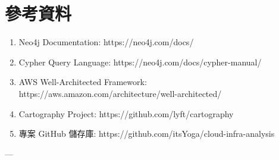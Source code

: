 \documentclass[11pt,a4paper]{ctexart}
\begin{document}
\section{參考資料}

\begin{enumerate}[leftmargin=1.5em]
\item Neo4j Documentation: https://neo4j.com/docs/
\item Cypher Query Language: https://neo4j.com/docs/cypher-manual/
\item AWS Well-Architected Framework: https://aws.amazon.com/architecture/well-architected/
\item Cartography Project: https://github.com/lyft/cartography
\item 專案 GitHub 儲存庫: https://github.com/itsYoga/cloud-infra-analysis
\end{enumerate}

---
\end{document}
